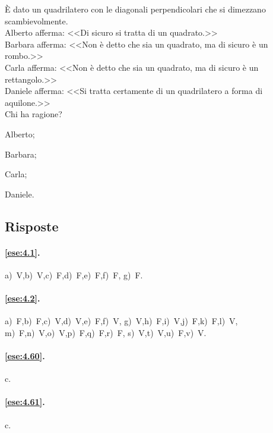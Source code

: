 \begin{esercizio}
\label{ese:4.67}
\`E dato un quadrilatero con le diagonali perpendicolari che si 
dimezzano scambievolmente.\\
Alberto afferma: <<Di sicuro si tratta di un quadrato.>>\\
Barbara afferma: <<Non è detto che sia un quadrato, ma di sicuro è un 
rombo.>>\\
Carla afferma: <<Non è detto che sia un quadrato, ma di sicuro è un 
rettangolo.>>\\
Daniele afferma: <<Si tratta certamente di un quadrilatero a forma di 
aquilone.>>\\
Chi ha ragione?
\begin{multicols}{4}
\begin{enumeratea}
\item Alberto;
\item Barbara;
\item Carla;
\item Daniele.
\end{enumeratea}
\end{multicols}
\end{esercizio}


\subsection{Risposte}

\begingroup
\hypersetup{linkcolor=black}

\paragraph{\ref{ese:4.1}.}
a)~V,\quad b)~V,\quad c)~F,\quad d)~F,\quad e)~F,\quad f)~F,\quad 
g)~F.

\paragraph{\ref{ese:4.2}.}
a)~F,\quad b)~F,\quad c)~V,\quad d)~V,\quad e)~F,\quad f)~V,\quad 
g)~V,\quad h)~F,\quad i)~V,\quad j)~F,\quad k)~F,\quad l)~V,\quad 
m)~F,\quad n)~V,\quad o)~V,\quad p)~F,\quad q)~F,\quad r)~F,\quad 
s)~V,\quad t)~V,\quad u)~F,\quad v)~V.

\paragraph{\ref{ese:4.60}.}
c.

\paragraph{\ref{ese:4.61}.}
c.

